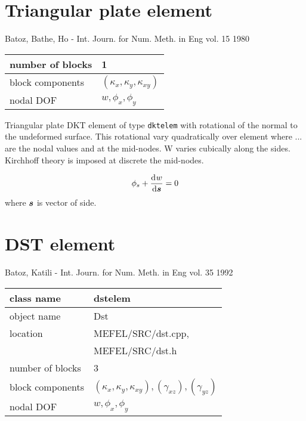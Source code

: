 \section{Triangular plate element}
\label{sectdktplate}

Batoz, Bathe, Ho - Int. Journ. for Num. Meth. in Eng vol. 15 1980

\begin{tabular}{|l|l|}
\hline
number of blocks & 1
\\ \hline
block components & $(\kappa_x,\kappa_y,\kappa_{xy})$
\\ \hline
nodal DOF & $w,\phi_x,\phi_y$
\\ \hline
\end{tabular}

Triangular plate DKT element of type {\tt dktelem} with rotational of the normal to the 
undeformed surface. This rotational vary quadratically over element where ... are the nodal
values and at the mid-nodes. W varies cubically along the sides. Kirchhoff theory is
imposed at discrete the mid-nodes.

\begin{equation}
\phi_s + \mbox{$\displaystyle\frac{{\rm d}\>\!{w}}{{\rm d}{\mbox{\boldmath$s$}}}$} = 0
\end{equation}
where $\mbox{\boldmath$s$}$ is vector of side.

\section{DST element}
\label{sectdstelem}
 Batoz, Katili - Int. Journ. for Num. Meth. in Eng vol. 35 1992

\begin{tabular}{|l|l|}
\hline
class name & dstelem
\\ \hline
object name & Dst
\\ \hline
location & MEFEL/SRC/dst.cpp,
\\
 & MEFEL/SRC/dst.h
\\ \hline
number of blocks & 3
\\ \hline
block components & $(\kappa_x,\kappa_y,\kappa_{xy}),(\gamma_{xz}),(\gamma_{yz})$
\\ \hline
nodal DOF & $w,\phi_x,\phi_y$
\\ \hline
\end{tabular}

